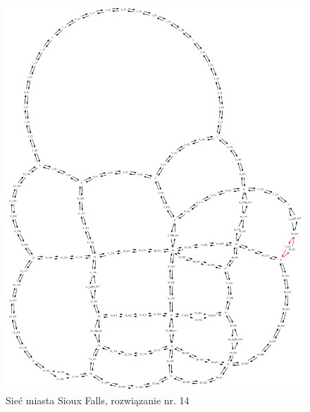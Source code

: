 \documentclass[twoside,12pt]{report}
\begin{document}
\begin{figure}[ht]
\centering
\includegraphics[totalheight=0.580\textheight, angle=90]{img/sioux-out/14/network2}
\caption{Sieć miasta Sioux Falls, rozwiązanie nr. 14}
\label{sioux14}
\end{figure}
\end{document}
